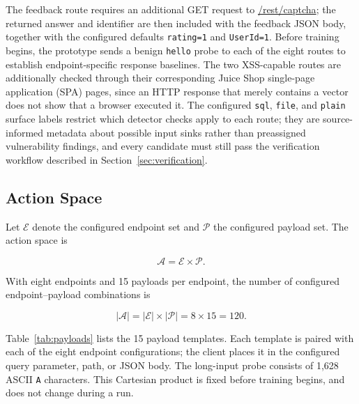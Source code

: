 \documentclass[conference, a4paper]{IEEEtran}
\begin{document}
The feedback route requires an additional GET request to
\url{/rest/captcha}; the returned answer and identifier are then
included with the feedback JSON body, together with the configured
defaults \texttt{rating=1} and \texttt{UserId=1}. Before training
begins, the prototype sends a benign \texttt{hello} probe to each
of the eight routes to establish endpoint-specific response
baselines. The two XSS-capable routes are additionally checked
through their corresponding Juice Shop single-page application
(SPA) pages, since an HTTP response that merely contains a vector
does not show that a browser executed it. The configured
\texttt{sql}, \texttt{file}, and \texttt{plain} surface labels
restrict which detector checks apply to each route; they are
source-informed metadata about possible input sinks rather than
preassigned vulnerability findings, and every candidate must still
pass the verification workflow described in
Section~\ref{sec:verification}.

\subsection{Action Space}

Let $\mathcal{E}$ denote the configured endpoint set and
$\mathcal{P}$ the configured payload set. The action space is

\begin{equation}
\mathcal{A} = \mathcal{E} \times \mathcal{P}.
\label{eq:actionspace}
\end{equation}

With eight endpoints and 15 payloads per endpoint, the number of
configured endpoint--payload combinations is

\begin{equation}
|\mathcal{A}| = |\mathcal{E}| \times |\mathcal{P}|
= 8 \times 15 = 120.
\label{eq:actioncount}
\end{equation}

Table~\ref{tab:payloads} lists the 15 payload templates. Each
template is paired with each of the eight endpoint configurations;
the client places it in the configured query parameter, path, or
JSON body. The long-input probe consists of 1,628 ASCII \texttt{A}
characters. This Cartesian product is fixed before training
begins, and does not change during a run.
\end{document}

